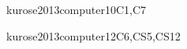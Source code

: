 \begin{syllabus}
\begin{unit}{\NCLocalAreaNetworks}{}{kurose2013computer}{10}{C1,C7}
\begin{topics}%
    \item \NCLocalAreaNetworksTopicMultiple
    \item \NCLocalAreaNetworksTopicCommon
    \item \NCLocalAreaNetworksTopicLocal
    \item \NCLocalAreaNetworksTopicEthernet
    \item \NCLocalAreaNetworksTopicSwitching
\end{topics}
\begin{learningoutcomes}
	\item \NCLocalAreaNetworksLODescribeHowForwardedEthernet [\Familiarity]
	\item \NCLocalAreaNetworksLODescribeTheIp [\Familiarity]
	\item \NCLocalAreaNetworksLODescribeTheIp [\Familiarity]
	\item \NCLocalAreaNetworksLODescribeTheIn [\Familiarity]
\end{learningoutcomes}
\end{unit}

\begin{unit}{\NCResourceAllocation}{}{kurose2013computer}{12}{C6,CS5,CS12}
\begin{topics}%
    \item \NCResourceAllocationTopicNeed
    \item \NCResourceAllocationTopicFixed
    \item \NCResourceAllocationTopicEnd
    \item \NCResourceAllocationTopicFairness
    \item \NCResourceAllocationTopicPrinciples
    \item \NCResourceAllocationTopicApproaches
\end{topics}
\begin{learningoutcomes}
	\item \NCResourceAllocationLODescribeHowBe [\Familiarity]
	\item \NCResourceAllocationLODescribeTheInNetwork [\Familiarity]
	\item \NCResourceAllocationLOCompareAndAnd [\Familiarity]
	\item \NCResourceAllocationLOCompareAndApproaches [\Familiarity]
\end{learningoutcomes}
\end{unit}


\end{syllabus}
